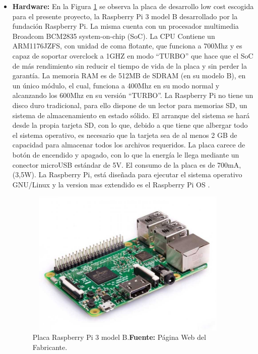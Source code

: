 \begin{itemize}
    \item \textbf{Hardware:}
    En la Figura \ref{fig:4.4} se observa la placa de desarrollo low cost escogida para el presente proyecto, la Raspberry Pi 3 model B desarrollado por la fundación Raspberry Pi. La misma cuenta con un procesador multimedia Broadcom BCM2835 system-on-chip (SoC).
    \newline
    \hfill
    La CPU Contiene un ARM1176JZFS, con unidad de coma flotante, que funciona a 700Mhz y es capaz de soportar overclock a 1GHZ en modo “TURBO” que hace que el SoC de más rendimiento sin reducir el tiempo de vida de la placa y sin perder la garantía. 
    La memoria RAM es de 512MB de SDRAM (en su modelo B), en un único módulo, el cual, funciona a 400Mhz en su modo normal y alcanzando los 600Mhz en su versión “TURBO”.
    La  Raspberry Pi no tiene un disco duro tradicional, para ello dispone de un lector para memorias SD, un sistema de almacenamiento en estado sólido. El arranque del sistema se hará desde la propia tarjeta SD, con lo que, debido a que tiene que albergar todo el sistema operativo, es necesario que la tarjeta sea de al menos 2 GB de capacidad para almacenar todos los archivos requeridos.
    La placa carece de botón de encendido y apagado, con lo que la energía le llega mediante un conector microUSB estándar de 5V. El consumo de la placa es de 700mA, (3,5W).
    La Raspberry Pi, está diseñada para ejecutar el sistema operativo GNU/Linux y la version mas extendido es el Raspberry Pi OS .
    \begin{figure}[ht]
        \centering
        \includegraphics[width=100mm, height=70mm]{Imagenes/2021/imag35.jpg}
        \caption[Placa Raspberry Pi 3 model B]{Placa Raspberry Pi 3 model B.\textbf{Fuente:} Página Web del Fabricante.}
        \label{fig:4.4}
    \end{figure}


\end{itemize}
